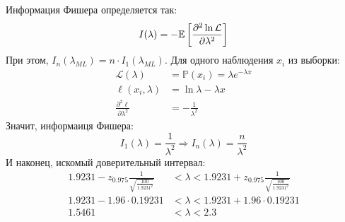 \documentclass{article}
\begin{document}
Информация Фишера определяется так:
\begin{equation*}
    I(\lambda)=-\mathbb{E}\left[\frac{\partial^2\ln\mathcal{L}}{\partial\lambda^2}\right]
\end{equation*}
При этом, $I_n\left(\lambda_{M L}\right)=n\cdot I_1(\lambda_{ML})$. Для одного наблюдения $x_i$ из выборки:
\begin{equation*}
    \begin{aligned}
        \mathcal{L}(\lambda)&=\mathbb{P}(x_i)=\lambda e^{-\lambda x}\\
        \ell(x_i,\lambda)&= \ln \lambda - \lambda x\\
        \frac{\partial^2 \ell}{\partial\lambda^2}&= -\frac{1}{\lambda^2}
    \end{aligned}
\end{equation*}
Значит, информаиця Фишера:
\begin{equation*}
    I_1(\lambda)=\frac{1}{\lambda^2}\Longrightarrow I_n(\lambda)=\frac{n}{\lambda^2}
\end{equation*}
И наконец, искомый доверительный интервал:
\begin{equation*}
    \begin{aligned}
        1.9231-z_{0.975}\frac{1}{\sqrt{\frac{100}{1.9231^2}}}&<\lambda<1.9231+z_{0.975}\frac{1}{\sqrt{\frac{100}{1.9231^2}}}\\
        1.9231-1.96\cdot0.19231&<\lambda<1.9231+1.96\cdot0.19231\\
        1.5461&<\lambda<2.3
    \end{aligned}
\end{equation*}
\end{document}
